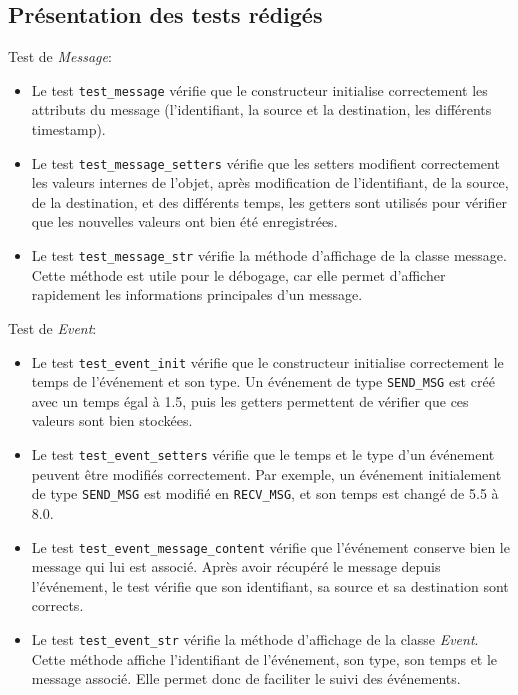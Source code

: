 \documentclass[11pt,a4paper]{article}
\begin{document}
\bigskip
\bigskip

\subsection{Présentation des tests rédigés}

Test de \emph{Message}:
\begin{itemize}
    \item Le test \lstinline|test_message| vérifie que le constructeur initialise correctement les attributs du message (l'identifiant, la source et la destination, les différents timestamp).
    \item Le test \lstinline|test_message_setters| vérifie que les setters modifient correctement les valeurs internes de l'objet, après modification de l'identifiant, de la source, de la destination, et des différents temps, les getters sont utilisés pour vérifier que les nouvelles valeurs ont bien été enregistrées.
    \item Le test \lstinline|test_message_str| vérifie la méthode d'affichage de la classe message. Cette méthode est utile pour le débogage, car elle permet d'afficher rapidement les informations principales d'un message.
\end{itemize}

\bigskip

Test de \emph{Event}:
\begin{itemize}
    \item Le test \lstinline|test_event_init| vérifie que le constructeur initialise correctement le temps de l'événement et son type. Un événement de type \lstinline|SEND_MSG| est créé avec un temps égal à 1.5, puis les getters permettent de vérifier que ces valeurs sont bien stockées.
    \item Le test \lstinline|test_event_setters| vérifie que le temps et le type d'un événement peuvent être modifiés correctement. Par exemple, un événement initialement de type \lstinline|SEND_MSG| est modifié en \lstinline|RECV_MSG|, et son temps est changé de 5.5 à 8.0.
    \item Le test \lstinline|test_event_message_content| vérifie que l'événement conserve bien le message qui lui est associé. Après avoir récupéré le message depuis l'événement, le test vérifie que son identifiant, sa source et sa destination sont corrects.
    \item Le test \lstinline|test_event_str| vérifie la méthode d'affichage de la classe \emph{Event}. Cette méthode affiche l'identifiant de l'événement, son type, son temps et le message associé. Elle permet donc de faciliter le suivi des événements.
\end{itemize}
\end{document}
